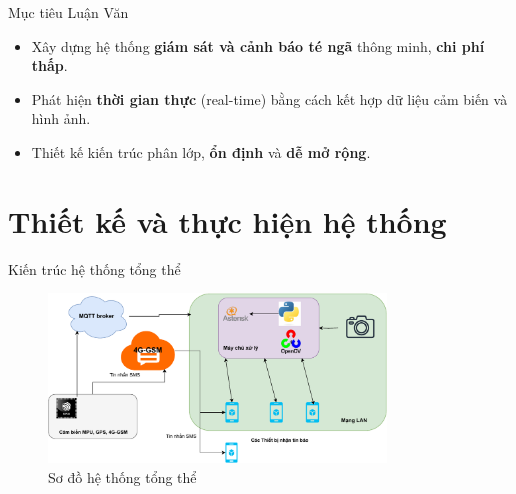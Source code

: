 \begin{frame}{Mục tiêu Luận Văn}
    \begin{itemize}
        \item Xây dựng hệ thống \textbf{giám sát và cảnh báo té ngã} thông minh, \textbf{chi phí thấp}.
        \item Phát hiện \textbf{thời gian thực} (real-time) bằng cách kết hợp dữ liệu cảm biến và hình ảnh.
        \item Thiết kế kiến trúc phân lớp, \textbf{ổn định} và \textbf{dễ mở rộng}.
    \end{itemize}
\end{frame}

\section{Thiết kế và thực hiện hệ thống}

\begin{frame}{Kiến trúc hệ thống tổng thể}
    \begin{figure}
        \centering
        \includegraphics[width=0.8\textwidth]{images/resuilt_structure_diagram.pdf}
        \caption{Sơ đồ hệ thống tổng thể}
    \end{figure}
\end{frame}


